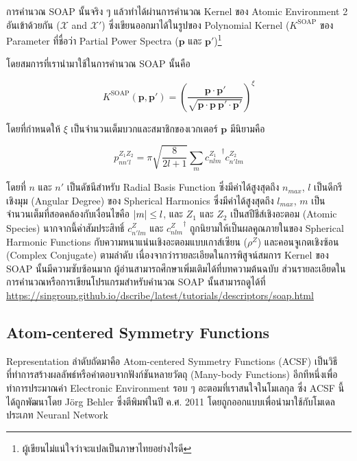 การคำนวณ SOAP นั้นจริง ๆ แล้วทำได้ผ่านการคำนวณ Kernel ของ Atomic Environment 2 อันเข้าด้วยกัน ($\mathcal{X}$ and $\mathcal{X}'$)
ซึ่งเขียนออกมาได้ในรูปของ Polynomial Kernel ($K^\mathrm{SOAP}$ ของ Parameter ที่ชื่อว่า Partial Power Spectra 
($\mathbf{p}$ และ $\mathbf{p}'$)\footnote{ผู้เขียนไม่แน่ใจว่าจะแปลเป็นภาษาไทยอย่างไรดี} 

โดยสมการที่เรานำมาใช้ในการคำนวณ SOAP นั้นคือ

\begin{equation}
    K^\mathrm{SOAP}(\mathbf{p}, \mathbf{p'}) = \left( \frac{\mathbf{p} \cdot \mathbf{p'}}{\sqrt{\mathbf{p} 
    \cdot \mathbf{p}~\mathbf{p'} \cdot \mathbf{p'}}}\right)^{\xi}
\end{equation}

\noindent โดยที่กำหนดให้ $\xi$ เป็นจำนวนเต็มบวกและสมาชิกของเวกเตอร์ $\mathbf{p}$ มีนิยามคือ 

\begin{equation}
    p^{Z_1 Z_2}_{n n' l} = \pi \sqrt{\frac{8}{2l+1}}\sum_m {c^{Z_1}_{n l m}}^{\dagger} c^{Z_2}_{n' l m}
\end{equation}

\noindent โดยที่ $n$ และ $n'$ เป็นดัชนีสำหรับ Radial Basis Function ซึ่งมีค่าได้สูงสุดถึง $n_{max}$, $l$ เป็นดีกรีเชิงมุม 
(Angular Degree) ของ Spherical Harmonics ซึ่งมีค่าได้สูงสุดถึง $l_{max}$, $m$ เป็นจำนวนเต็มที่สอดคล้องกับเงื่อนไขคือ $\abs{m} \leq l$, 
และ $Z_{1}$ และ $Z_{2}$ เป็นสปีชีส์เชิงอะตอม (Atomic Species) นากจากนี้ค่าสัมประสิทธิ์ $c^{Z}_{n'lm}$ และ ${c^{Z}_{nlm}}^{\dagger}$ 
ถูกนิยามให้เป็นผลคูณภายในของ Spherical Harmonic Functions กับความหนาแน่นเชิงอะตอมแบบเกาส์เซียน ($\rho^Z$) และคอนจูเกตเชิงซ้อน 
(Complex Conjugate) ตามลำดับ\cite{de2016} เนื่องจากว่ารายละเอียดในการพิสูจน์สมการ Kernel ของ SOAP นั้นมีความซับซ้อนมาก
ผู้อ่านสามารถศึกษาเพิ่มเติมได้ที่บทความต้นฉบับ ส่วนรายละเอียดในการคำนวณหรือการเขียนโปรแกรมสำหรับคำนวณ SOAP นั้นสามารถดูได้ที่
\url{https://singroup.github.io/dscribe/latest/tutorials/descriptors/soap.html}

\subsection{Atom-centered Symmetry Functions}

Representation ลำดับถัดมาคือ Atom-centered Symmetry Functions (ACSF) เป็นวิธีที่ทำการสร้างผลลัพธ์หรือคำตอบจากฟังก์ชันหลายวัตถุ
(Many-body Functions) อีกทีหนึ่งเพื่อทำการประมาณค่า Electronic Environment รอบ ๆ อะตอมที่เราสนใจในโมเลกุล
ซึ่ง ACSF นี้ได้ถูกพัฒนาโดย J{\"o}rg Behler ซึ่งตีพิมพ์ในปี ค.ศ. 2011 โดยถูกออกแบบเพื่อนำมาใช้กับโมเดลประเภท Neuranl Network
\cite{behler2011}

